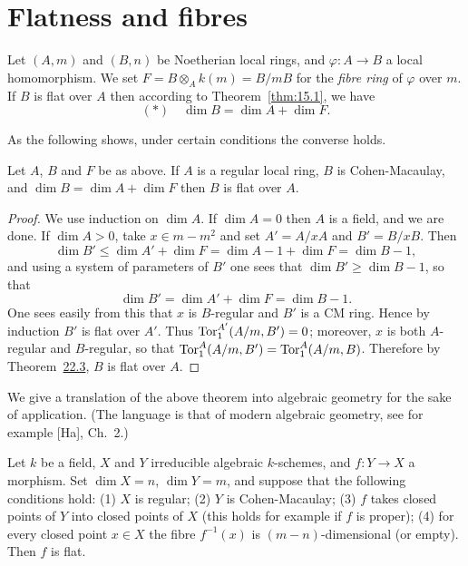 \section{Flatness and fibres}\label{sec:23}

Let $(A, m)$ and $(B, n)$ be Noetherian local rings, and $\varphi\colon A \to B$ a local
homomorphism. We set $F = B \otimes_A k(m) = B/mB$ for the \emph{fibre ring} of
$\varphi$ over $m$. If $B$ is flat over $A$ then according to Theorem~\ref{thm:15.1}, we
have
\[
  (*) \quad \dim B = \dim A + \dim F.
\]

As the following shows, under certain conditions the converse holds.

\begin{theorem}\label{thm:23.1}
Let $A$, $B$ and $F$ be as above. If $A$ is a regular local ring, $B$ is
Cohen-Macaulay, and $\dim B = \dim A + \dim F$ then $B$ is flat over $A$.
\end{theorem}

\begin{proof}
We use induction on $\dim A$. If $\dim A = 0$ then $A$ is a field, and we are
done. If $\dim A > 0$, take $x \in m - m^2$ and set $A' = A/xA$ and $B' = B/xB$. Then
\[
  \dim B' \le \dim A' + \dim F = \dim A - 1 + \dim F = \dim B - 1,
\]
and using a system of parameters of $B'$ one sees that $\dim B' \ge \dim B - 1$, so
that
\[
  \dim B' = \dim A' + \dim F = \dim B - 1.
\]
One sees easily from this that $x$ is $B$-regular and $B'$ is a CM ring. Hence by
induction $B'$ is flat over $A'$. Thus $\operatorname{Tor}^{A'}_1(A/m, B') = 0$; moreover, $x$ is
both $A$-regular and $B$-regular, so that $\operatorname{Tor}^A_1(A/m, B') = \operatorname{Tor}^A_1(A/m, B)$.
Therefore by Theorem~\hyperref[thm:22.3]{22.3}, $B$ is flat over $A$.
\end{proof}

We give a translation of the above theorem into algebraic geometry for the sake
of application. (The language is that of modern algebraic geometry, see for
example [Ha], Ch.~2.)

\begin{corollary*}
Let $k$ be a field, $X$ and $Y$ irreducible algebraic $k$-schemes, and
$f\colon Y \to X$ a morphism. Set $\dim X = n$, $\dim Y = m$, and suppose that the
following conditions hold: (1) $X$ is regular; (2) $Y$ is Cohen-Macaulay; (3) $f$
takes closed points of $Y$ into closed points of $X$ (this holds for example if
$f$ is proper); (4) for every closed point $x \in X$ the fibre $f^{-1}(x)$ is
$(m - n)$-dimensional (or empty). Then $f$ is flat.
\end{corollary*}

